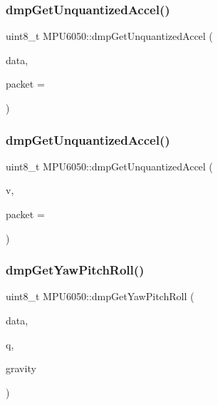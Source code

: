 \mbox{\label{classMPU6050_a9e427b2ba43ee6e7ba057e7f638836d1}} 
\subsubsection{\texorpdfstring{dmpGetUnquantizedAccel()}{dmpGetUnquantizedAccel()}\hspace{0.1cm}{\footnotesize\ttfamily [2/3]}}
{\footnotesize\ttfamily uint8\+\_\+t M\+P\+U6050\+::dmp\+Get\+Unquantized\+Accel (\begin{DoxyParamCaption}\item[{int16\+\_\+t $\ast$}]{data,  }\item[{const uint8\+\_\+t $\ast$}]{packet = {} }\end{DoxyParamCaption})}

\mbox{\label{classMPU6050_a814788fea7688802a9f1d91573e94630}} 
\subsubsection{\texorpdfstring{dmpGetUnquantizedAccel()}{dmpGetUnquantizedAccel()}\hspace{0.1cm}{\footnotesize\ttfamily [3/3]}}
{\footnotesize\ttfamily uint8\+\_\+t M\+P\+U6050\+::dmp\+Get\+Unquantized\+Accel (\begin{DoxyParamCaption}\item[{\mbox{\hyperlink{classVectorInt16}{Vector\+Int16}} $\ast$}]{v,  }\item[{const uint8\+\_\+t $\ast$}]{packet = {} }\end{DoxyParamCaption})}

\mbox{\label{classMPU6050_a4e8c0d64e9ad7266b1a7970bb38d6b27}} 
\subsubsection{\texorpdfstring{dmpGetYawPitchRoll()}{dmpGetYawPitchRoll()}}
{\footnotesize\ttfamily uint8\+\_\+t M\+P\+U6050\+::dmp\+Get\+Yaw\+Pitch\+Roll (\begin{DoxyParamCaption}\item[{float $\ast$}]{data,  }\item[{\mbox{\hyperlink{classQuaternion}{Quaternion}} $\ast$}]{q,  }\item[{\mbox{\hyperlink{classVectorFloat}{Vector\+Float}} $\ast$}]{gravity }\end{DoxyParamCaption})}



